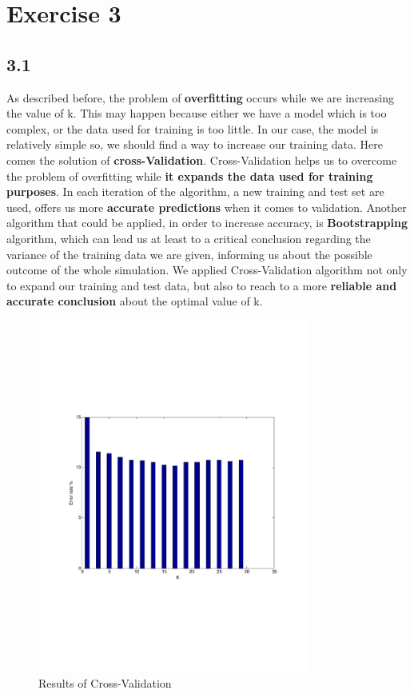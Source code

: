 \documentclass[letterpaper,11pt]{article}
\begin{document}
 \section*{Exercise 3}
 \subsection*{3.1}
As described before, the problem of \textbf{overfitting} occurs while we are increasing the value of k. This may happen because either we have a model which is too complex, or the data used for training is too little. In our case, the model is relatively simple so, we should find a way to increase our training data. Here comes the solution of \textbf{cross-Validation}. Cross-Validation helps us to overcome the problem of overfitting while \textbf{it expands the data used for training purposes}. In each iteration of the algorithm, a new training and test set are used, offers us more \textbf{accurate predictions} when it comes to validation. Another algorithm that could be applied, in order to increase accuracy, is \textbf{Bootstrapping} algorithm, which can lead us at least to a critical conclusion regarding the variance of the training data we are given, informing us about the possible outcome of the whole simulation. We applied Cross-Validation algorithm not only to expand our training and test data, but also to reach to a more \textbf{reliable and accurate conclusion} about the optimal value of k. 


\begin{figure}[!h]
\centering
  \includegraphics[trim = 0cm 7cm 0cm 7cm, clip, width=0.8\textwidth]{figures/CrossValResults.pdf}
  \caption{Results of Cross-Validation}
  \label{fig:4}
\end{figure}
\end{document}
